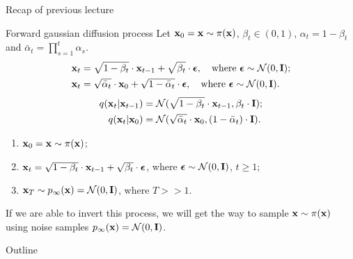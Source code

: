 \begin{frame}{Recap of previous lecture}
	\begin{block}{Forward gaussian diffusion process}
		Let $\mathbf{x}_0 = \mathbf{x} \sim \pi(\mathbf{x})$, $\beta_t \in (0, 1)$, $\alpha_t = 1 - \beta_t$ and $\bar{\alpha}_t = \prod_{s=1}^t \alpha_s$. 
		\begin{align*}
			\mathbf{x}_t &= \sqrt{1 - \beta_t} \cdot \mathbf{x}_{t - 1} + \sqrt{\beta_t} \cdot \boldsymbol{\epsilon}, \quad \text{where }\boldsymbol{\epsilon} \sim \mathcal{N}(0, \mathbf{I}); \\
			\mathbf{x}_t &= \sqrt{\bar{\alpha}_t} \cdot \mathbf{x}_{0} + \sqrt{1 - \bar{\alpha}_t} \cdot \boldsymbol{\epsilon}, \quad \text{where } \boldsymbol{\epsilon} \sim \mathcal{N}(0, \mathbf{I}).
		\end{align*}
		\vspace{-0.6cm}
		\begin{align*}
			q(\mathbf{x}_t | \mathbf{x}_{t-1}) &= \mathcal{N}(\sqrt{1 - \beta_t} \cdot \mathbf{x}_{t-1}, \beta_t \cdot \mathbf{I}); \\
			q(\mathbf{x}_t | \mathbf{x}_0) &= \mathcal{N}(\sqrt{\bar{\alpha}_t} \cdot \mathbf{x}_0, (1 - \bar{\alpha}_t) \cdot \mathbf{I}).
		\end{align*}
		\vspace{-0.6cm}
	\end{block}
	\begin{enumerate}
		\item $\mathbf{x}_0 = \mathbf{x} \sim \pi(\mathbf{x})$;
		\item $\mathbf{x}_t = \sqrt{1 - \beta_t} \cdot \mathbf{x}_{t - 1} + \sqrt{\beta_t} \cdot \boldsymbol{\epsilon}$, where $\boldsymbol{\epsilon} \sim \mathcal{N}(0, \mathbf{I})$, $t \geq 1$;
		\item $\mathbf{x}_T \sim p_{\infty}(\mathbf{x}) = \mathcal{N}(0, \mathbf{I})$, where $T >> 1$.
	\end{enumerate}
	If we are able to invert this process, we will get the way to sample $\mathbf{x} \sim \pi(\mathbf{x})$ using noise samples $p_{\infty}(\mathbf{x}) = \mathcal{N}(0, \mathbf{I})$.
\end{frame}
\begin{frame}{Outline}
	\tableofcontents
\end{frame}
